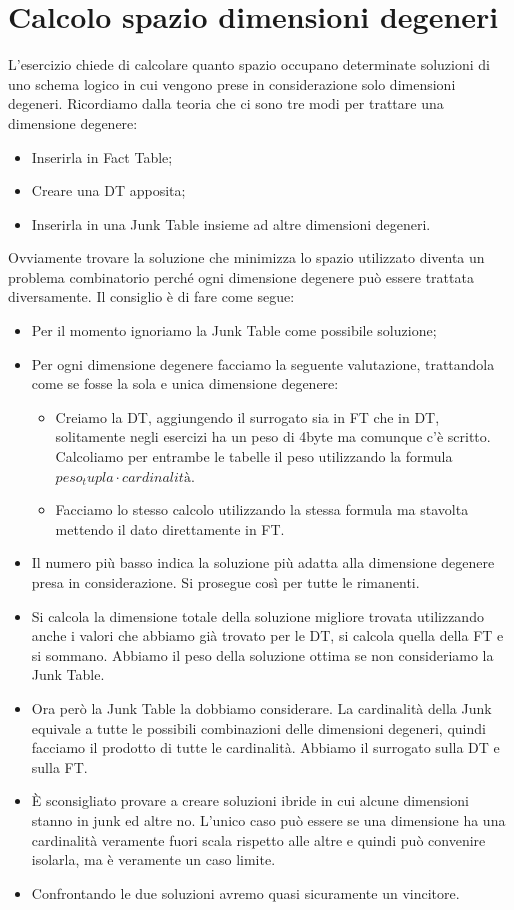 \section{Calcolo spazio dimensioni degeneri}
L'esercizio chiede di calcolare quanto spazio occupano determinate soluzioni di uno schema logico in cui vengono prese in considerazione solo dimensioni degeneri.
\noindent Ricordiamo dalla teoria che ci sono tre modi per trattare una dimensione degenere:
\begin{itemize}
	\item Inserirla in Fact Table;
	\item Creare una DT apposita;
	\item Inserirla in una Junk Table insieme ad altre dimensioni degeneri.
\end{itemize}
Ovviamente trovare la soluzione che minimizza lo spazio utilizzato diventa un problema combinatorio perché ogni dimensione degenere può essere trattata diversamente. Il consiglio è di fare come segue:
\begin{itemize}
	\item Per il momento ignoriamo la Junk Table come possibile soluzione;
	\item Per ogni dimensione degenere facciamo la seguente valutazione, trattandola come se fosse la sola e unica dimensione degenere:
	\begin{itemize}
		\item Creiamo la DT, aggiungendo il surrogato sia in FT che in DT, solitamente negli esercizi ha un peso di 4byte ma comunque c'è scritto. Calcoliamo per entrambe le tabelle il peso utilizzando la formula $peso_tupla \cdot cardinalità$.
		\item Facciamo lo stesso calcolo utilizzando la stessa formula ma stavolta mettendo il dato direttamente in FT.
	\end{itemize}
	\item Il numero più basso indica la soluzione più adatta alla dimensione degenere presa in considerazione. Si prosegue così per tutte le rimanenti.
	\item Si calcola la dimensione totale della soluzione migliore trovata utilizzando anche i valori che abbiamo già trovato per le DT, si calcola quella della FT e si sommano. Abbiamo il peso della soluzione ottima se non consideriamo la Junk Table.
	\item Ora però la Junk Table la dobbiamo considerare. La cardinalità della Junk equivale a tutte le possibili combinazioni delle dimensioni degeneri, quindi facciamo il prodotto di tutte le cardinalità. Abbiamo il surrogato sulla DT e sulla FT.
	\item È sconsigliato provare a creare soluzioni ibride in cui alcune dimensioni stanno in junk ed altre no. L'unico caso può essere se una dimensione ha una cardinalità veramente fuori scala rispetto alle altre e quindi può convenire isolarla, ma è veramente un caso limite.
	\item Confrontando le due soluzioni avremo quasi sicuramente un vincitore.
\end{itemize}
